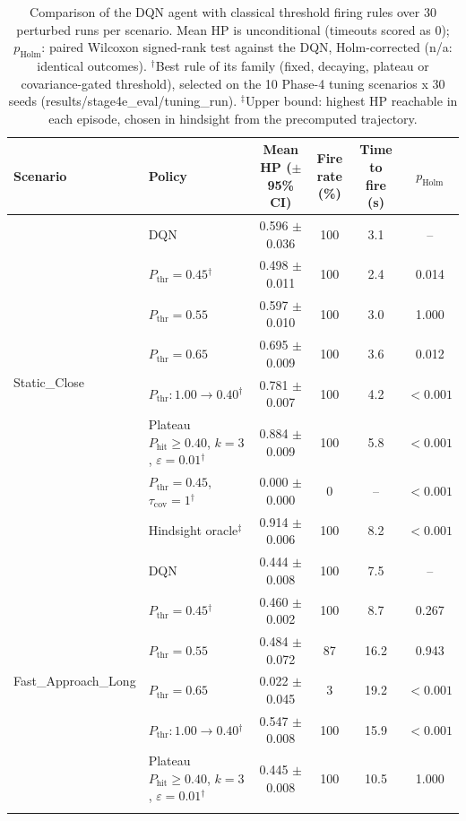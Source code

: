 \begin{table}[htbp]
\centering
\caption{Comparison of the DQN agent with classical threshold firing rules over 30 perturbed runs per scenario. Mean HP is unconditional (timeouts scored as 0); $p_{\mathrm{Holm}}$: paired Wilcoxon signed-rank test against the DQN, Holm-corrected (n/a: identical outcomes). $^{\dagger}$Best rule of its family (fixed, decaying, plateau or covariance-gated threshold), selected on the 10 Phase-4 tuning scenarios x 30 seeds (results/stage4e_eval/tuning_run). $^{\ddagger}$Upper bound: highest HP reachable in each episode, chosen in hindsight from the precomputed trajectory.}
\label{tab:comparison-traditional-rl}
\small
\begin{tabular}{llcccc}
\toprule
\textbf{Scenario} & \textbf{Policy} & \textbf{Mean HP ($\pm$95\% CI)} & \textbf{Fire rate (\%)} & \textbf{Time to fire (s)} & $p_{\mathrm{Holm}}$ \\
\midrule
\multirow{8}{*}{Static\_Close} & DQN & 0.596 $\pm$ 0.036 & 100 & 3.1 & -- \\
 & $P_{\mathrm{thr}}=0.45$$^{\dagger}$ & 0.498 $\pm$ 0.011 & 100 & 2.4 & 0.014 \\
 & $P_{\mathrm{thr}}=0.55$ & 0.597 $\pm$ 0.010 & 100 & 3.0 & 1.000 \\
 & $P_{\mathrm{thr}}=0.65$ & 0.695 $\pm$ 0.009 & 100 & 3.6 & 0.012 \\
 & $P_{\mathrm{thr}}: 1.00 \to 0.40$$^{\dagger}$ & 0.781 $\pm$ 0.007 & 100 & 4.2 & $<0.001$ \\
 & Plateau $P_{\mathrm{hit}}\geq0.40$, $k=3$, $\varepsilon=0.01$$^{\dagger}$ & 0.884 $\pm$ 0.009 & 100 & 5.8 & $<0.001$ \\
 & $P_{\mathrm{thr}}=0.45$, $\tau_{\mathrm{cov}}=1$$^{\dagger}$ & 0.000 $\pm$ 0.000 & 0 & -- & $<0.001$ \\
 & Hindsight oracle$^{\ddagger}$ & 0.914 $\pm$ 0.006 & 100 & 8.2 & $<0.001$ \\
\midrule
\multirow{8}{*}{Fast\_Approach\_Long} & DQN & 0.444 $\pm$ 0.008 & 100 & 7.5 & -- \\
 & $P_{\mathrm{thr}}=0.45$$^{\dagger}$ & 0.460 $\pm$ 0.002 & 100 & 8.7 & 0.267 \\
 & $P_{\mathrm{thr}}=0.55$ & 0.484 $\pm$ 0.072 & 87 & 16.2 & 0.943 \\
 & $P_{\mathrm{thr}}=0.65$ & 0.022 $\pm$ 0.045 & 3 & 19.2 & $<0.001$ \\
 & $P_{\mathrm{thr}}: 1.00 \to 0.40$$^{\dagger}$ & 0.547 $\pm$ 0.008 & 100 & 15.9 & $<0.001$ \\
 & Plateau $P_{\mathrm{hit}}\geq0.40$, $k=3$, $\varepsilon=0.01$$^{\dagger}$ & 0.445 $\pm$ 0.008 & 100 & 10.5 & 1.000 \\
$$
\end{tabular}
\end{table}
